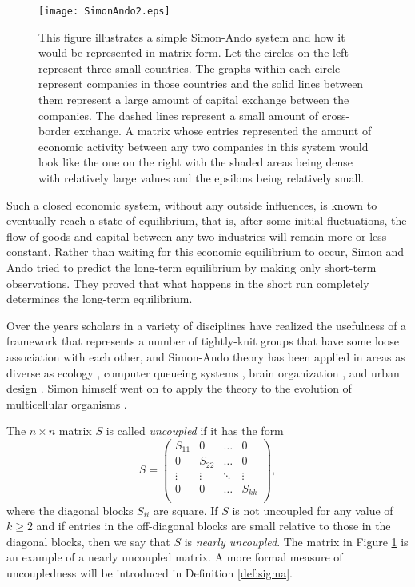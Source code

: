 \documentclass[final]{siamltex}
\begin{document}
\begin{figure}[h] 
\begin{center}
\texttt{[image: SimonAndo2.eps]}
\caption{This figure illustrates a simple Simon-Ando system and how it would be represented in matrix form. Let the circles on the left represent three small countries. The graphs within each circle represent companies in those countries and the solid lines between them represent a large amount of capital exchange between the companies. The dashed lines represent a small amount of cross-border exchange. A matrix whose entries represented the amount of economic activity between any two companies in this system would look like the one on the right with the shaded areas being dense with relatively large values and the epsilons being relatively small.} 
\label{fig:abc}
\end{center}   
\end{figure} 

Such a closed economic system, without any outside influences, is known to eventually reach a state of equilibrium, that is, after some initial fluctuations, the flow of goods and capital between any two industries will remain more or less constant. Rather than waiting for this economic equilibrium to occur, Simon and Ando tried to predict the long-term equilibrium by making only short-term observations. They proved that what happens in the short run completely determines the long-term equilibrium.

Over the years scholars in a variety of disciplines have realized the usefulness of a framework that represents a number of tightly-knit groups that have some loose association with each other, and Simon-Ando theory has been applied in areas as diverse as ecology \cite{levin1992pps}, computer queueing systems \cite{courtois}, brain organization \cite{sporns2000ccr}, and urban design \cite{salingaros2000cuc}. Simon himself went on to apply the theory to the evolution of multicellular organisms \cite{simon2002nds}.

The $n \times n$ matrix $S$ is called \emph{uncoupled} if it has the form
 \[ S=
\left(
\begin{array}{cccc}
S_{11}  & 0   & \dots &0   \\
0  & S_{22}   & \dots & 0    \\
\vdots   & \vdots   & \ddots & \vdots \\
0  & 0   & \dots & S_{kk}    \\ 
\end{array}
\right),
\]
where the diagonal blocks $S_{ii}$ are square. If $S$ is not uncoupled for any value of $k \ge 2$ and if entries in the off-diagonal blocks are small relative to those in the diagonal blocks, then we say that $S$ is \emph{nearly uncoupled}. The matrix in Figure \ref{fig:abc} is an example of a nearly uncoupled matrix. A more formal measure of uncoupledness will be introduced in Definition \ref{def:sigma}.
\end{document}
